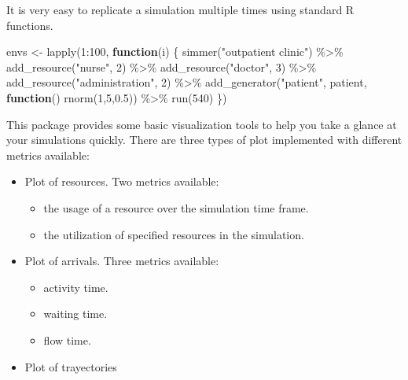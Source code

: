\documentclass[
]{book}
\newenvironment{Shaded}{\begin{snugshade}}{\end{snugshade}}
\newcommand{\ControlFlowTok}[1]{\textcolor[rgb]{0.13,0.29,0.53}{\textbf{#1}}}
\newcommand{\DecValTok}[1]{\textcolor[rgb]{0.00,0.00,0.81}{#1}}
\newcommand{\FloatTok}[1]{\textcolor[rgb]{0.00,0.00,0.81}{#1}}
\newcommand{\FunctionTok}[1]{\textcolor[rgb]{0.00,0.00,0.00}{#1}}
\newcommand{\NormalTok}[1]{#1}
\newcommand{\OtherTok}[1]{\textcolor[rgb]{0.56,0.35,0.01}{#1}}
\newcommand{\SpecialCharTok}[1]{\textcolor[rgb]{0.00,0.00,0.00}{#1}}
\newcommand{\StringTok}[1]{\textcolor[rgb]{0.31,0.60,0.02}{#1}}
\providecommand{\tightlist}{%
  \setlength{\itemsep}{0pt}\setlength{\parskip}{0pt}}
\begin{document}
It is very easy to replicate a simulation multiple times using standard R functions.

\begin{Shaded}
\begin{Highlighting}[]
\NormalTok{envs }\OtherTok{\textless{}{-}} \FunctionTok{lapply}\NormalTok{(}\DecValTok{1}\SpecialCharTok{:}\DecValTok{100}\NormalTok{, }\ControlFlowTok{function}\NormalTok{(i) \{}
  \FunctionTok{simmer}\NormalTok{(}\StringTok{"outpatient clinic"}\NormalTok{) }\SpecialCharTok{\%\textgreater{}\%}
    \FunctionTok{add\_resource}\NormalTok{(}\StringTok{"nurse"}\NormalTok{, }\DecValTok{2}\NormalTok{) }\SpecialCharTok{\%\textgreater{}\%}
    \FunctionTok{add\_resource}\NormalTok{(}\StringTok{"doctor"}\NormalTok{, }\DecValTok{3}\NormalTok{) }\SpecialCharTok{\%\textgreater{}\%}
    \FunctionTok{add\_resource}\NormalTok{(}\StringTok{"administration"}\NormalTok{, }\DecValTok{2}\NormalTok{) }\SpecialCharTok{\%\textgreater{}\%}
    \FunctionTok{add\_generator}\NormalTok{(}\StringTok{"patient"}\NormalTok{, patient, }\ControlFlowTok{function}\NormalTok{() }\FunctionTok{rnorm}\NormalTok{(}\DecValTok{1}\NormalTok{,}\DecValTok{5}\NormalTok{,}\FloatTok{0.5}\NormalTok{)) }\SpecialCharTok{\%\textgreater{}\%}
    \FunctionTok{run}\NormalTok{(}\DecValTok{540}\NormalTok{)}
\NormalTok{\})}
\end{Highlighting}
\end{Shaded}

This package provides some basic visualization tools to help you take a glance at your simulations quickly. There are three types of plot implemented with different metrics available:

\begin{itemize}
\tightlist
\item
  Plot of resources. Two metrics available:

  \begin{itemize}
  \tightlist
  \item
    the usage of a resource over the simulation time frame.
  \item
    the utilization of specified resources in the simulation.
  \end{itemize}
\item
  Plot of arrivals. Three metrics available:

  \begin{itemize}
  \tightlist
  \item
    activity time.
  \item
    waiting time.
  \item
    flow time.
  \end{itemize}
\item
  Plot of trayectories
\end{itemize}
\end{document}
